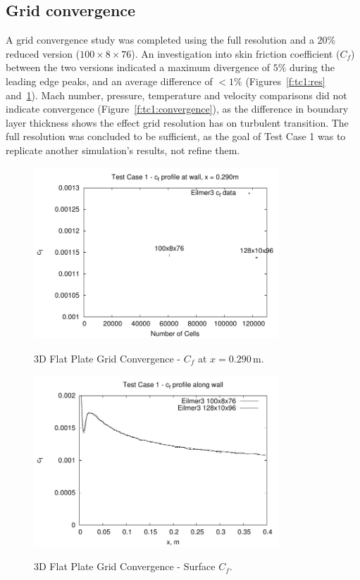 \subsection{Grid convergence}
A grid convergence study was completed using the full resolution and a $20\%$ reduced version ($100\times8\times76$). An investigation into skin friction coefficient ($C_f$) between the two versions indicated a maximum divergence of $5\%$ during the leading edge peaks, and an average difference of $<1\%$ (Figures~\ref{f:tc1:res} and~\ref{f:tc1:comp}). Mach number, pressure, temperature and velocity comparisons did not indicate convergence (Figure~\ref{f:tc1:convergence}), as the difference in boundary layer thickness shows the effect grid resolution has on turbulent transition. The full resolution was concluded to be sufficient, as the goal of Test Case 1 was to replicate another simulation's results, not refine them. 
%
\begin{figure}[h]
 \begin{center}
  \includegraphics[width=9.2cm]{./chap6-3Dflatplate/figs/tc1-cf-resolution.pdf}
  \caption{3D Flat Plate Grid Convergence - $C_f$ at $x=0.290$\,m.}
  \label{f:tc1:res}
  \vspace{1cm}
  \includegraphics[width=9.2cm]{./chap6-3Dflatplate/figs/gridconverge/tc1-cf-comparison.pdf}
  \caption{3D Flat Plate Grid Convergence - Surface $C_f$.}
  \label{f:tc1:comp}
 \end{center}
\end{figure}
